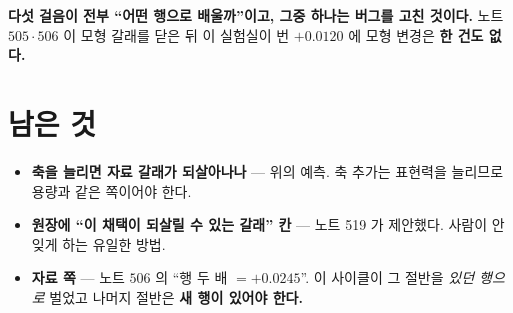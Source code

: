 \documentclass[11pt]{article}
\begin{document}
\textbf{다섯 걸음이 전부 ``어떤 행으로 배울까''이고, 그중 하나는 버그를
고친 것이다.} 노트 $505 \cdot 506$ 이 모형 갈래를 닫은 뒤 이 실험실이 번
$+0.0120$ 에 모형 변경은 \textbf{한 건도 없다.}

\section*{남은 것}

\begin{itemize}
\item \textbf{축을 늘리면 자료 갈래가 되살아나나} --- 위의 예측. 축 추가는
표현력을 늘리므로 용량과 같은 쪽이어야 한다.
\item \textbf{원장에 ``이 채택이 되살릴 수 있는 갈래'' 칸} --- 노트 519 가
제안했다. 사람이 안 잊게 하는 유일한 방법.
\item \textbf{자료 쪽} --- 노트 $506$ 의 ``행 두 배 $= +0.0245$''. 이
사이클이 그 절반을 \emph{있던 행으로} 벌었고 나머지 절반은 \textbf{새 행이
있어야 한다.}
\end{itemize}
\end{document}
